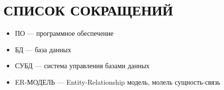 \chapter*{\hfill{\centering СПИСОК СОКРАЩЕНИЙ}\hfill}

\begin{itemize}
	\item[] ПО --- программное обеспечение
	\item[] БД --- база данных
	\item[] СУБД --- система управления базами данных
	\item[] ER-МОДЕЛЬ --- Entity-Relationship модель, молель сущность-связь
\end{itemize}
